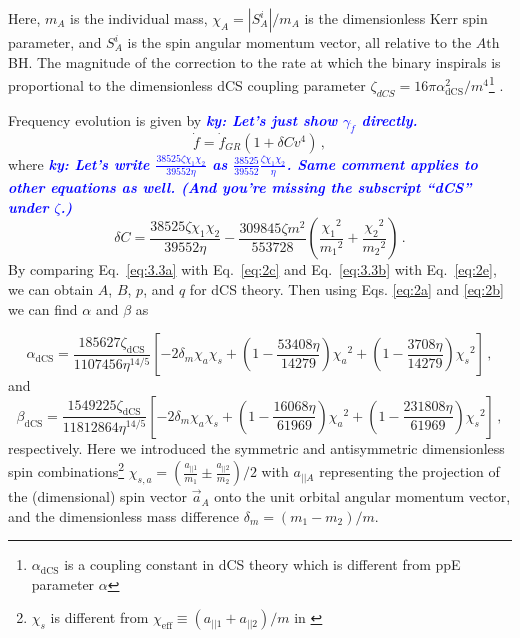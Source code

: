 \documentclass[11pt]{article}
\newcommand{\ky}[1]{\textcolor{blue}{\it{\textbf{ky: #1}}} }
\begin{document}
Here, $m_A$ is the individual mass, $\chi_A =\left | S_{A}^{i} \right |/m_A$ is the dimensionless Kerr spin parameter, and $S_{A}^{i}$ is the spin angular momentum vector, all relative to the $\mathit{A}\text{th}$ BH. The magnitude of the correction to the rate at which the binary inspirals is proportional to the dimensionless dCS coupling parameter $\zeta_{dCS}=16\pi \alpha_{\text{dCS}}^2/m^4$\footnote{$\alpha_{\text{dCS}}$ is a coupling constant in dCS theory which is different from ppE parameter $\alpha$} .


Frequency evolution is given by \cite{Yagi:2012vf} \ky{Let's just show $\gamma_{\dot f}$ directly.}
\begin{equation}\label{eq:3.3b}
\dot{f}=\dot{f}_{GR}\left(1+\delta C v^4\right)\,,
\end{equation}
 where \ky{Let's write $\frac{38525 \zeta \chi_1 \chi_2}{39552 \eta }$ as $\frac{38525}{39552} \frac{\zeta \chi_1 \chi_2}{\eta}$. Same comment applies to other equations as well. (And you're missing the subscript ``dCS'' under $\zeta$.)}
 \begin{equation}
 \delta C= \frac{38525 \zeta \chi_1 \chi_2}{39552 \eta }-\frac{309845 \zeta  m^2 }{553728 }\left(\frac{{\chi_1}^2}{{m_1}^2}+\frac{{\chi_2}^2}{{m_2}^2}\right)\,.
 \end{equation}
 By comparing Eq.~\eqref{eq:3.3a} with Eq.~\eqref{eq:2c} and Eq.~\eqref{eq:3.3b} with Eq.~\eqref{eq:2e}, we can obtain $A$, $B$, $p$,  and $q$ for dCS theory. Then using Eqs. \eqref{eq:2a} and \eqref{eq:2b} we can find $\alpha$ and $\beta$ as
 
 \begin{equation}
 \alpha_{\text{dCS}}=\frac{185627 \zeta_{\text{dCS}} }{1107456 \eta ^{14/5}}\left[-2 \text{$\delta_m$} \text{$\chi_a$} \text{$\chi_s$}+\left(1-\frac{53408 \eta }{14279}\right) \text{$\chi_a$}^2+\left(1-\frac{3708 \eta }{14279}\right) \text{$\chi_s$}^2\right]\,,
 \end{equation}
 and
 \begin{equation}
 \beta_{\text{dCS}}=\frac{1549225 \zeta_{\text{dCS}} }{11812864 \eta ^{14/5}}\left[-2 \text{$\delta_m$} \text{$\chi_a$} \text{$\chi_s$}+\left(1-\frac{16068 \eta }{61969}\right) \text{$\chi_a$}^2+\left(1-\frac{231808 \eta }{61969}\right) \text{$\chi_s$}^2\right]\,,
 \end{equation}
 respectively. Here we introduced the symmetric and antisymmetric dimensionless spin combinations\footnote{$\chi_s$ is different from $\chi_{\text{eff}}\equiv (a_{||1}+a_{||2})/m$ in \cite{TheLIGOScientific:2016wfe}} $\chi_{s,a}=(\frac{a_{||1}}{m_1}\pm\frac{a_{||2}}{m_2})/2$ with $a_{||A}$ representing the projection of the (dimensional) spin vector $\vec{a}_A$ onto the unit orbital angular momentum vector, and the dimensionless mass difference $\delta_m=(m_1-m_2)/m$.
 
\end{document}
